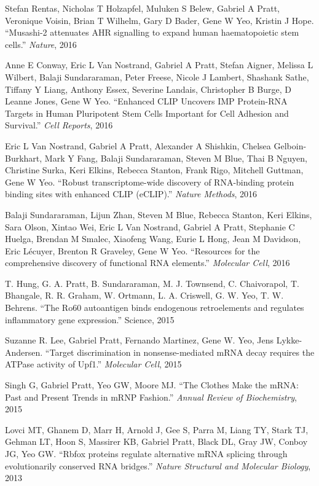 \begin{frontmatter}
\begin{vitapage}
\begin{publications}
      \item Stefan Rentas, Nicholas T Holzapfel, Muluken S Belew, Gabriel A Pratt, Veronique Voisin, Brian T Wilhelm, Gary D Bader, Gene W Yeo, Kristin J Hope. ``Musashi-2 attenuates AHR signalling to expand human haematopoietic stem cells.'' \emph{Nature}, 2016
      \item Anne E Conway, Eric L Van Nostrand, Gabriel A Pratt, Stefan Aigner, Melissa L Wilbert, Balaji Sundararaman, Peter Freese, Nicole J Lambert, Shashank Sathe, Tiffany Y Liang, Anthony Essex, Severine Landais, Christopher B Burge, D Leanne Jones, Gene W Yeo. ``Enhanced CLIP Uncovers IMP Protein-RNA Targets in Human Pluripotent Stem Cells Important for Cell Adhesion and Survival.'' \emph{Cell Reports}, 2016
      \item Eric L Van Nostrand, Gabriel A Pratt, Alexander A Shishkin, Chelsea Gelboin-Burkhart, Mark Y Fang, Balaji Sundararaman, Steven M Blue, Thai B Nguyen, Christine Surka, Keri Elkins, Rebecca Stanton, Frank Rigo, Mitchell Guttman, Gene W Yeo. ``Robust transcriptome-wide discovery of RNA-binding protein binding sites with enhanced CLIP (eCLIP).'' \emph{Nature Methods}, 2016
      \item Balaji Sundararaman, Lijun Zhan, Steven M Blue, Rebecca Stanton, Keri Elkins, Sara Olson, Xintao Wei, Eric L Van Nostrand, Gabriel A Pratt, Stephanie C Huelga, Brendan M Smalec, Xiaofeng Wang, Eurie L Hong, Jean M Davidson, Eric Lécuyer, Brenton R Graveley, Gene W Yeo. ``Resources for the comprehensive discovery of functional RNA elements.'' \emph{Molecular Cell}, 2016
      \item T. Hung, G. A. Pratt, B. Sundararaman, M. J. Townsend, C. Chaivorapol, T. Bhangale, R. R. Graham, W. Ortmann, L. A. Criswell, G. W. Yeo, T. W. Behrens. ``The Ro60 autoantigen binds endogenous retroelements and regulates inflammatory gene expression.'' Science, 2015
      \item Suzanne R. Lee, Gabriel Pratt, Fernando Martinez, Gene W. Yeo, Jens Lykke-Andersen. ``Target discrimination in nonsense-mediated mRNA decay requires the ATPase activity of Upf1.'' \emph{Molecular Cell}, 2015
      \item Singh G, Gabriel Pratt, Yeo GW, Moore MJ. ``The Clothes Make the mRNA: Past and Present Trends in mRNP Fashion.'' \emph{Annual Review of Biochemistry}, 2015
      \item Lovci MT, Ghanem D, Marr H, Arnold J, Gee S, Parra M, Liang TY, Stark TJ, Gehman LT, Hoon S, Massirer KB, Gabriel Pratt, Black DL, Gray JW, Conboy JG, Yeo GW. ``Rbfox proteins regulate alternative mRNA splicing through evolutionarily conserved RNA bridges.'' \emph{Nature Structural and Molecular Biology}, 2013

\end{publications}
\end{vitapage}
\end{frontmatter}

